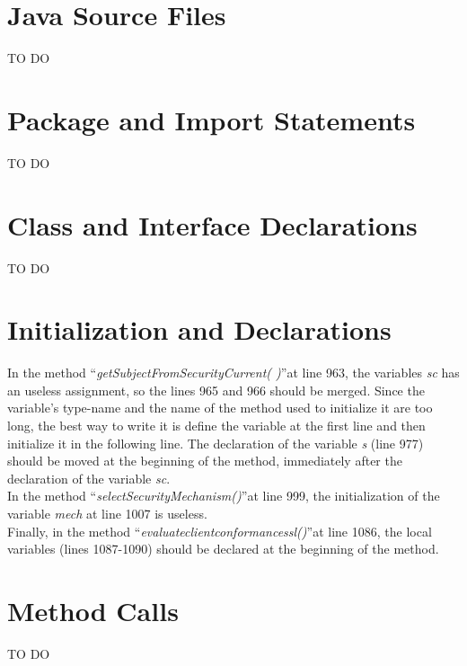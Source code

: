 \documentclass[\mainpath/main]{subfiles}
\begin{document}
\section{Java Source Files}
\label{CodeInspectionChecklist:JaveSourceFiles}
TO DO

\section{Package and Import Statements}
\label{CodeInspectionChecklist:PackageandImportStatements}
TO DO

\section{Class and Interface Declarations}
\label{CodeInspectionChecklist:ClassandInterfaceDeclarations}
TO DO

\section{Initialization and Declarations}
\label{CodeInspectionChecklist:InitializationandDeclarations}
In the method \textquotedblleft \textit{getSubjectFromSecurityCurrent( )}\textquotedblright at line 963, the variables \textit{sc} has an useless assignment, so the lines 965 and 966 should be merged. Since the variable's type-name and the name of the method used to initialize it are too long, the best way to write it is define the variable at the first line and then initialize it in the following line.
The declaration of the variable \textit{s} (line 977) should be moved at the beginning of the method, immediately after the declaration of the variable \textit{sc}.\\
In the method \textquotedblleft \textit{selectSecurityMechanism(\textellipsis)}\textquotedblright at line 999, the initialization of the variable \textit{mech} at line 1007 is useless.\\
Finally, in the method \textquotedblleft \textit{evaluate\textunderscore client\textunderscore conformance\textunderscore ssl(\textellipsis)}\textquotedblright  at line 1086, the local variables (lines 1087-1090) should be declared at the beginning of the method.

\section{Method Calls}
\label{CodeInspectionChecklist:MethodCalls}
TO DO
\end{document}
